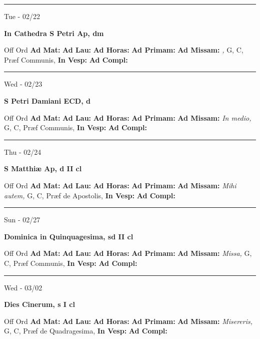 \documentclass[letterpaper, 10pt]{article}
\begin{document}
\hrule
\begin{center}
Tue - 02/22
\end{center}\textbf{ \large In Cathedra S Petri Ap, \textnormal{\normalsize dm}}
\begin{justify}
Off Ord
\textbf{Ad Mat: }
\textbf{Ad Lau: }
\textbf{Ad Horas: }
\textbf{Ad Primam: }
\textbf{Ad Missam:} \textit{, } G, C, Præf Communis, 
\textbf{In Vesp: }
\textbf{Ad Compl: }\end{justify}



\hrule
\begin{center}
Wed - 02/23
\end{center}\textbf{ \large S Petri Damiani ECD, \textnormal{\normalsize d}}
\begin{justify}
Off Ord
\textbf{Ad Mat: }
\textbf{Ad Lau: }
\textbf{Ad Horas: }
\textbf{Ad Primam: }
\textbf{Ad Missam:} \textit{In medio, } G, C, Præf Communis, 
\textbf{In Vesp: }
\textbf{Ad Compl: }\end{justify}



\hrule
\begin{center}
Thu - 02/24
\end{center}\textbf{ \large S Matthiæ Ap, \textnormal{\normalsize d II cl}}
\begin{justify}
Off Ord
\textbf{Ad Mat: }
\textbf{Ad Lau: }
\textbf{Ad Horas: }
\textbf{Ad Primam: }
\textbf{Ad Missam:} \textit{Mihi autem, } G, C, Præf de Apostolis, 
\textbf{In Vesp: }
\textbf{Ad Compl: }\end{justify}



\hrule
\begin{center}
Sun - 02/27
\end{center}\textbf{ \large Dominica in Quinquagesima, \textnormal{\normalsize sd II cl}}
\begin{justify}
Off Ord
\textbf{Ad Mat: }
\textbf{Ad Lau: }
\textbf{Ad Horas: }
\textbf{Ad Primam: }
\textbf{Ad Missam:} \textit{Missa, } G, C, Præf Communis, 
\textbf{In Vesp: }
\textbf{Ad Compl: }\end{justify}



\hrule
\begin{center}
Wed - 03/02
\end{center}\textbf{ \large Dies Cinerum, \textnormal{\normalsize s I cl}}
\begin{justify}
Off Ord
\textbf{Ad Mat: }
\textbf{Ad Lau: }
\textbf{Ad Horas: }
\textbf{Ad Primam: }
\textbf{Ad Missam:} \textit{Misereris, } G, C, Præf de Quadragesima, 
\textbf{In Vesp: }
\textbf{Ad Compl: }\end{justify}
\end{document}
